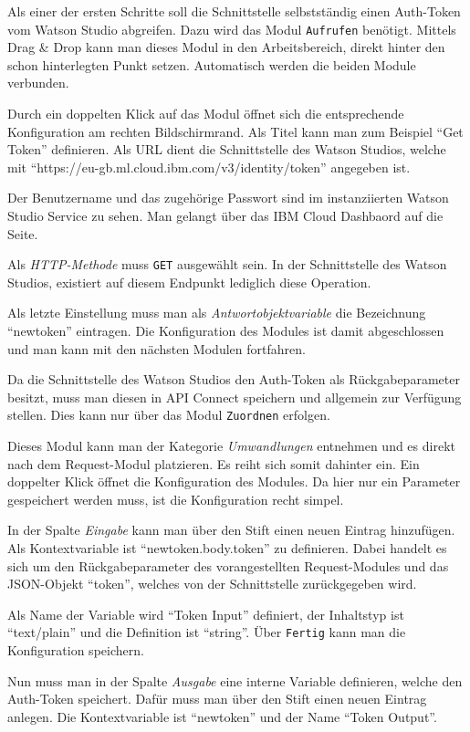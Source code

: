 Als einer der ersten Schritte soll die Schnittstelle selbstständig einen Auth-Token vom Watson Studio abgreifen. Dazu
wird das Modul \texttt{Aufrufen} benötigt. Mittels Drag \& Drop kann man dieses Modul in den Arbeitsbereich, direkt
hinter den schon hinterlegten Punkt setzen. Automatisch werden die beiden Module verbunden.

Durch ein doppelten Klick auf das Modul öffnet sich die entsprechende Konfiguration am rechten Bildschirmrand. Als Titel
kann man zum Beispiel \enquote{Get Token} definieren. Als URL dient die Schnittstelle des Watson Studios, welche mit
\enquote{https://eu-gb.ml.cloud.ibm.com/v3/identity/token} angegeben ist.

Der Benutzername und das zugehörige Passwort sind im instanziierten Watson Studio Service zu sehen. Man gelangt über das
IBM Cloud Dashbaord auf die Seite.

Als \textit{HTTP-Methode} muss \texttt{GET} ausgewählt sein. In der Schnittstelle des Watson Studios, existiert auf
diesem Endpunkt lediglich diese Operation.

Als letzte Einstellung muss man als \textit{Antwortobjektvariable} die Bezeichnung \enquote{newtoken} eintragen. Die
Konfiguration des Modules ist damit abgeschlossen und man kann mit den nächsten Modulen fortfahren.

Da die Schnittstelle des Watson Studios den Auth-Token als Rückgabeparameter besitzt, muss man diesen in API Connect
speichern und allgemein zur Verfügung stellen. Dies kann nur über das Modul \texttt{Zuordnen} erfolgen.

Dieses Modul kann man der Kategorie \textit{Umwandlungen} entnehmen und es direkt nach dem Request-Modul platzieren. Es
reiht sich somit dahinter ein. Ein doppelter Klick öffnet die Konfiguration des Modules. Da hier nur ein Parameter
gespeichert werden muss, ist die Konfiguration recht simpel.

In der Spalte \textit{Eingabe} kann man über den Stift einen neuen Eintrag hinzufügen. Als Kontextvariable ist
\enquote{newtoken.body.token} zu definieren. Dabei handelt es sich um den Rückgabeparameter des vorangestellten
Request-Modules und das JSON-Objekt \enquote{token}, welches von der Schnittstelle zurückgegeben wird.

Als Name der Variable wird \enquote{Token Input} definiert, der Inhaltstyp ist \enquote{text/plain} und die Definition
ist \enquote{string}. Über \texttt{Fertig} kann man die Konfiguration speichern.

Nun muss man in der Spalte \textit{Ausgabe} eine interne Variable definieren, welche den Auth-Token speichert. Dafür
muss man über den Stift einen neuen Eintrag anlegen. Die Kontextvariable ist \enquote{newtoken} und der Name
\enquote{Token Output}.

